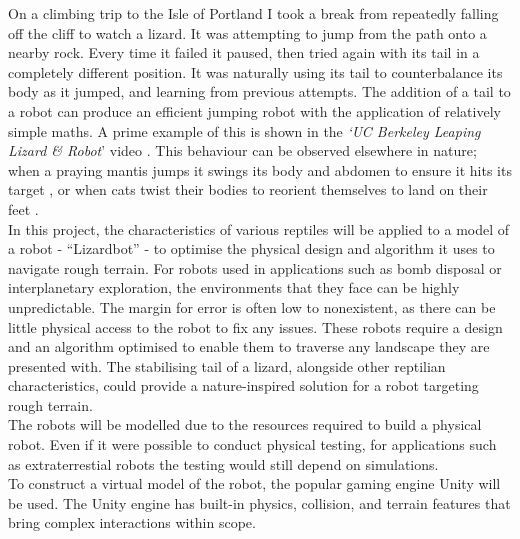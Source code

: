 \documentclass{article}
\begin{document}
On a climbing trip to the Isle of Portland I took a break from repeatedly falling off the cliff to watch a lizard. It was attempting to jump from the path onto a nearby rock. Every time it failed it paused, then tried again with its tail in a completely different position. It was naturally using its tail to counterbalance its body as it jumped, and learning from previous attempts. The addition of a tail to a robot can produce an efficient jumping robot with the application of relatively simple maths. A prime example of this is shown in the \textit{‘UC Berkeley Leaping Lizard \& Robot}’ video . This behaviour can be observed elsewhere in nature; when a praying mantis jumps it swings its body and abdomen to ensure it hits its target ,  or when cats twist their bodies to reorient themselves to land on their feet .\\

In this project, the characteristics of various reptiles will be applied to a model of a robot - “Lizardbot” - to optimise the physical design and algorithm it uses to navigate rough terrain. For robots used in applications such as bomb disposal or interplanetary exploration, the environments that they face can be highly unpredictable. The margin for error is often low to nonexistent, as there can be little physical access to the robot to fix any issues. These robots require a design and an algorithm optimised to enable them to traverse any landscape they are presented with. The stabilising tail of a lizard, alongside other reptilian characteristics, could provide a nature-inspired solution for a robot targeting rough terrain.\\

The robots will be modelled due to the resources required to build a physical robot. Even if it were possible to conduct physical testing, for applications such as extraterrestial robots the testing would still depend on simulations.\\
To construct a virtual model of the robot, the popular gaming engine Unity  will be used. The Unity engine has built-in physics, collision, and terrain features that bring complex interactions within scope.


\newpage
\end{document}
